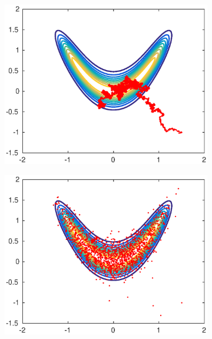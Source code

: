 \begin{figure}[t]
	\centering
	\begin{subfigure}{0.32\linewidth}
		\includegraphics[width=1\linewidth]{plots/MHvsRAM/MH_small}
	\end{subfigure}
	\begin{subfigure}{0.32\linewidth}
		\includegraphics[width=1\linewidth]{plots/MHvsRAM/MH_medium}
	\end{subfigure}
	\begin{subfigure}{0.32\linewidth}

\end{subfigure}
\end{figure}
